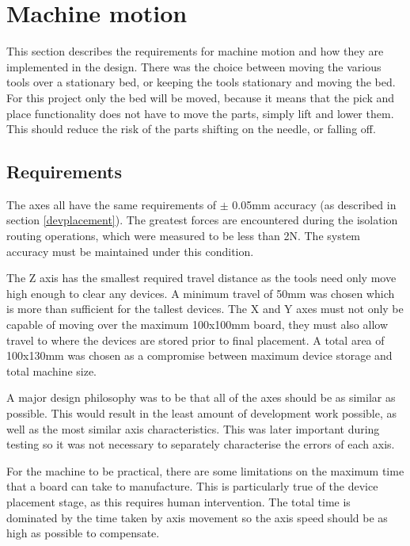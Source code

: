 
\section{Machine motion}
\label{firstsection}
This section describes the requirements for machine motion and how they 
are implemented in the design. There was the choice between moving the various tools over a stationary
bed, or keeping the tools stationary and moving the bed. For this project
only the bed will be moved, because it means that the pick
and place functionality does not have to move the parts, simply lift and lower them. This should reduce the risk of the parts
shifting on the needle, or falling off.%

\subsection{Requirements}
The axes all have the same requirements of $\pm$ 0.05mm accuracy (as 
described in section \ref{devplacement}). The greatest forces are
encountered during the isolation routing operations, which were
measured to be less than 2N. The system accuracy must be maintained
under this condition.

The Z axis has the smallest required travel distance as the tools
need only move high enough to clear any devices. A minimum travel of 50mm
was chosen which is more than sufficient for the tallest devices. The
X and Y axes must not only be capable of moving over the maximum 100x100mm
board, they must also allow travel to where the devices are stored prior
to final placement. A total area of 100x130mm was chosen as a compromise
between maximum device storage and total machine size.

A major design philosophy was to be that all of the axes should be as
similar as possible. This would result in the least amount of development
work possible, as well as the most similar axis characteristics. This 
was later important during testing so it was not necessary to separately
characterise the errors of each axis.

For the machine to be practical, there are some limitations on the 
maximum time that a board can take to manufacture. This is particularly 
true of the device placement stage, as this requires
human intervention. The total time is dominated by the time taken by axis
movement so the axis speed should be as high as possible to compensate.

